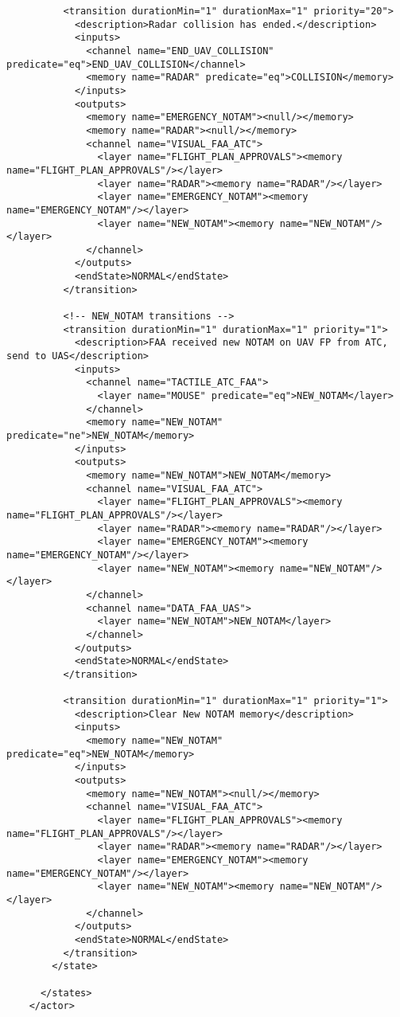 \begin{verbatim}
          <transition durationMin="1" durationMax="1" priority="20">
            <description>Radar collision has ended.</description>
            <inputs>
              <channel name="END_UAV_COLLISION" predicate="eq">END_UAV_COLLISION</channel>
              <memory name="RADAR" predicate="eq">COLLISION</memory>
            </inputs>
            <outputs>
              <memory name="EMERGENCY_NOTAM"><null/></memory>
              <memory name="RADAR"><null/></memory>
              <channel name="VISUAL_FAA_ATC">
                <layer name="FLIGHT_PLAN_APPROVALS"><memory name="FLIGHT_PLAN_APPROVALS"/></layer>
                <layer name="RADAR"><memory name="RADAR"/></layer>
                <layer name="EMERGENCY_NOTAM"><memory name="EMERGENCY_NOTAM"/></layer>
                <layer name="NEW_NOTAM"><memory name="NEW_NOTAM"/></layer>
              </channel>
            </outputs>
            <endState>NORMAL</endState>
          </transition>
          
          <!-- NEW_NOTAM transitions -->
          <transition durationMin="1" durationMax="1" priority="1">
            <description>FAA received new NOTAM on UAV FP from ATC, send to UAS</description>
            <inputs>
              <channel name="TACTILE_ATC_FAA">
                <layer name="MOUSE" predicate="eq">NEW_NOTAM</layer>
              </channel>
              <memory name="NEW_NOTAM" predicate="ne">NEW_NOTAM</memory>
            </inputs>
            <outputs>
              <memory name="NEW_NOTAM">NEW_NOTAM</memory>
              <channel name="VISUAL_FAA_ATC">
                <layer name="FLIGHT_PLAN_APPROVALS"><memory name="FLIGHT_PLAN_APPROVALS"/></layer>
                <layer name="RADAR"><memory name="RADAR"/></layer>
                <layer name="EMERGENCY_NOTAM"><memory name="EMERGENCY_NOTAM"/></layer>
                <layer name="NEW_NOTAM"><memory name="NEW_NOTAM"/></layer>
              </channel>
              <channel name="DATA_FAA_UAS">
                <layer name="NEW_NOTAM">NEW_NOTAM</layer>
              </channel>
            </outputs>
            <endState>NORMAL</endState>
          </transition>
          
          <transition durationMin="1" durationMax="1" priority="1">
            <description>Clear New NOTAM memory</description>
            <inputs>
              <memory name="NEW_NOTAM" predicate="eq">NEW_NOTAM</memory>
            </inputs>
            <outputs>
              <memory name="NEW_NOTAM"><null/></memory>
              <channel name="VISUAL_FAA_ATC">
                <layer name="FLIGHT_PLAN_APPROVALS"><memory name="FLIGHT_PLAN_APPROVALS"/></layer>
                <layer name="RADAR"><memory name="RADAR"/></layer>
                <layer name="EMERGENCY_NOTAM"><memory name="EMERGENCY_NOTAM"/></layer>
                <layer name="NEW_NOTAM"><memory name="NEW_NOTAM"/></layer>
              </channel>
            </outputs>
            <endState>NORMAL</endState>
          </transition>
        </state>
        
      </states>
    </actor>
\end{verbatim}
